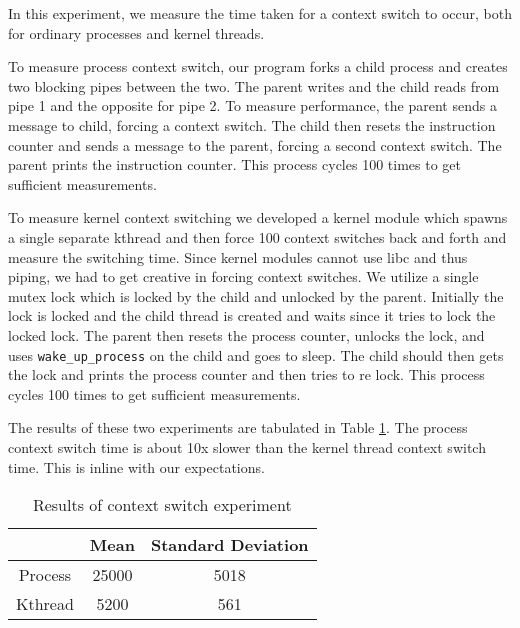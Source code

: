 
In this experiment, we measure the time taken for a context switch to occur, both for ordinary processes and kernel threads. 

To measure process context switch, our program forks a child process and creates two blocking pipes between the two.
The parent writes and the child reads from pipe 1 and the opposite for pipe 2.
To measure performance, the parent sends a message to child, forcing a context switch.
The child then resets the instruction counter and sends a message to the parent, forcing a second context switch.
The parent prints the instruction counter.
This process cycles 100 times to get sufficient measurements.

To measure kernel context switching we developed a kernel module which spawns a single separate kthread and then force 100 context switches back and forth and measure the switching time.
Since kernel modules cannot use libc and thus piping, we had to get creative in forcing context switches. 
We utilize a single mutex lock which is locked by the child and unlocked by the parent.
Initially the lock is locked and the child thread is created and waits since it tries to lock the locked lock.
The parent then resets the process counter, unlocks the lock, and uses {\tt wake\_up\_process} on the child and goes to sleep.
The child should then gets the lock and prints the process counter and then tries to re lock.
This process cycles 100 times to get sufficient measurements.

The results of these two experiments are tabulated in Table \ref{tab:exp1_5}.
The process context switch time is about 10x slower than the kernel thread context switch time.
This is inline with our expectations.

\begin{table}
\begin{tabular}{|c|c|c|}\hline
& Mean & Standard Deviation \\\hline
Process &  25000 & 5018\\
Kthread & 5200 & 561\\\hline
\end{tabular}
\caption{Results of context switch experiment}\label{tab:exp1_5}
\end{table}
